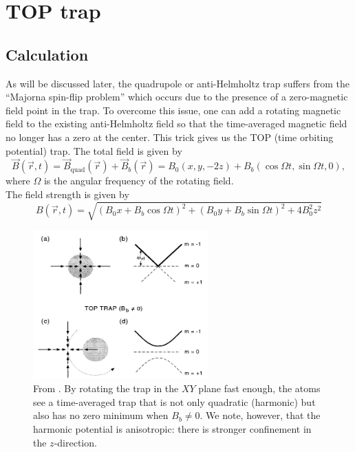 \documentclass{article}
\theoremstyle{definition}
\begin{document}
\newpage

\section{TOP trap}


\subsection{Calculation}

As will be discussed later, the quadrupole or anti-Helmholtz trap suffers from the ``Majorna spin-flip problem'' which occurs due to the presence of a zero-magnetic field point in the trap. To overcome this issue, one can add a rotating magnetic field to the existing anti-Helmholtz field so that the time-averaged magnetic field no longer has a zero at the center. This trick gives us the TOP (time orbiting potential) trap. The total field is given by 
\begin{equation*}
\vec{B}(\vec{r},t) = \vec{B}_\text{quad}(\vec{r}) + \vec{B}_b(\vec{r}) = B_0 (x,y,-2z) + B_b(\cos\Omega t, \sin\Omega t,0),
\end{equation*} 
where $\Omega$ is the angular frequency of the rotating field. \\


The field strength is given by 
\begin{equation*}
B(\vec{r},t) = \sqrt{(B_0 x + B_b\cos\Omega t)^2 + (B_0 y + B_b\sin\Omega t)^2 + 4 B_0^2 z^2 }
\end{equation*}

\begin{figure}[!htb]
	\centering
	\includegraphics[width=0.6\textwidth]{TOP_trap.png}
	\caption{From \cite{PhysRevLett.74.3352}. By rotating the trap in the $XY$ plane fast enough, the atoms see a time-averaged trap that is not only quadratic (harmonic) but also has no zero minimum when $B_b \neq 0$. We note, however, that the harmonic potential is anisotropic: there is stronger confinement in the $z$-direction.}
	\label{fig:cornell}
\end{figure}
\end{document}

